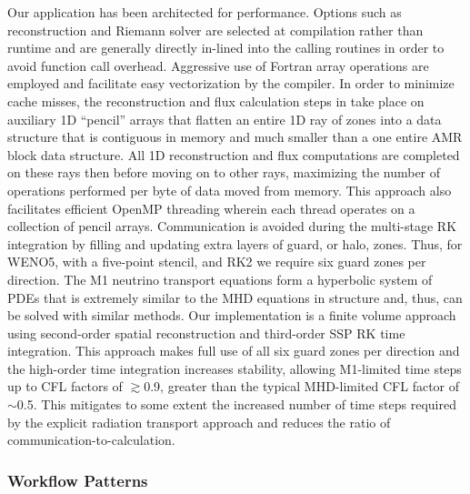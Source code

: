 Our \sparkmone application has been architected for performance.
Options such as reconstruction and Riemann solver are selected at compilation rather than runtime and are generally directly in-lined into the  calling routines in order to avoid function call overhead.
Aggressive use of Fortran array operations are employed and facilitate easy vectorization by the compiler.
In order to minimize cache misses, the reconstruction and flux calculation steps in \spark take place on auxiliary 1D ``pencil'' arrays that flatten an entire 1D ray of zones into a data structure that is contiguous in memory and much smaller than a one entire AMR block data structure.
All 1D reconstruction and flux computations are completed on these rays then before moving on to other rays, maximizing the number of operations performed per byte of data moved from memory.
This approach also facilitates efficient OpenMP threading wherein each thread operates on a collection of pencil arrays.
Communication is avoided during the multi-stage RK integration by filling and updating extra layers of guard, or halo, zones.
Thus, for WENO5, with a five-point stencil, and RK2 we require six guard zones per direction.
The M1 neutrino transport equations form a hyperbolic system of PDEs that is extremely similar to the MHD equations in structure and, thus, can be solved with similar methods.
Our implementation is a finite volume approach using second-order spatial reconstruction and third-order SSP RK time integration.
This approach makes full use of all six guard zones per direction and the high-order time integration increases stability, allowing M1-limited time steps up to CFL factors of $\gtrsim$0.9, greater than the typical MHD-limited CFL factor of $\sim$0.5.
This mitigates to some extent the increased number of time steps required by the explicit radiation transport approach and reduces the ratio of communication-to-calculation.


\subsubsection{Workflow Patterns}
\label{sec:workflow}

